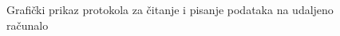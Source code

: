 \documentclass[times, utf8, zavrsni, square]{fer}
\begin{document}
    \begin{figure}[t]
        \centering
        \centering
        \caption{Grafički prikaz protokola za čitanje i pisanje podataka na udaljeno računalo}
        \label{fig:graf_1}
    \end{figure}
    \FloatBarrier
\end{document}
